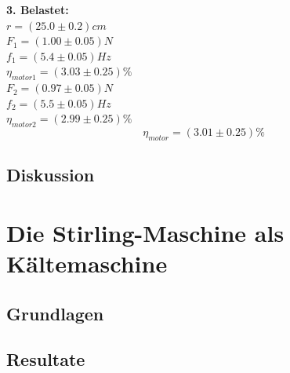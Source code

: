 \documentclass[12pt,a4paper]{article}
\begin{document}
\begin{multicols}{2}
%
%
%
%



\noindent \textbf{3. Belastet:}\\
$r = (25.0 \pm 0.2)cm$\\
$F_1 = (1.00 \pm 0.05)N$\\
$f_1 = (5.4 \pm 0.05)Hz$\\
$\eta_{motor1}=(3.03\pm 0.25)\%$\\
$F_2=(0.97\pm 0.05)N$\\
$f_2 = (5.5 \pm 0.05)Hz$\\
$\eta_{motor2}=(2.99\pm 0.25)\%$\\
$$\eta_{motor}=(3.01\pm 0.25)\%$$


\subsection{Diskussion}




\section{Die Stirling-Maschine als Kältemaschine}

\subsection{Grundlagen}


\subsection{Resultate}



\end{multicols}
\end{document}
